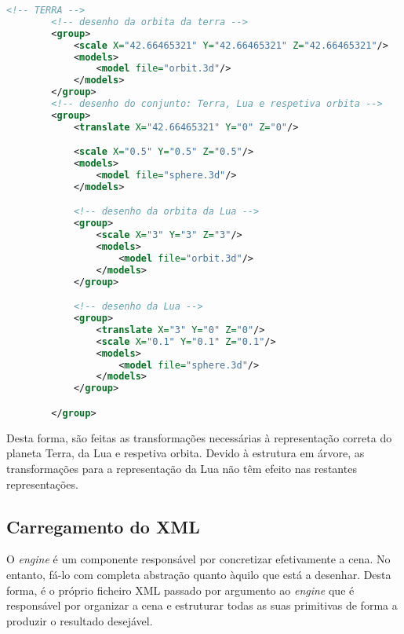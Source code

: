 \documentclass[a4paper]{article}
\begin{document}
\begin{lstlisting}[language=XML, caption=Representação de um exemplo de criação de nodos filhos.]
    <!-- TERRA -->
        <!-- desenho da orbita da terra -->
        <group>
            <scale X="42.66465321" Y="42.66465321" Z="42.66465321"/>
            <models>
                <model file="orbit.3d"/>
            </models>
        </group>
        <!-- desenho do conjunto: Terra, Lua e respetiva orbita -->
        <group>
            <translate X="42.66465321" Y="0" Z="0"/>

            <scale X="0.5" Y="0.5" Z="0.5"/>
            <models>
                <model file="sphere.3d"/>
            </models>

            <!-- desenho da orbita da Lua -->
            <group>
                <scale X="3" Y="3" Z="3"/>
                <models>
                    <model file="orbit.3d"/>
                </models>
            </group>

            <!-- desenho da Lua -->
            <group>
                <translate X="3" Y="0" Z="0"/>
                <scale X="0.1" Y="0.1" Z="0.1"/>
                <models>
                    <model file="sphere.3d"/>
                </models>
            </group>

        </group>
\end{lstlisting}

\par Desta forma, são feitas as transformações necessárias à representação correta do planeta Terra, da Lua e respetiva orbita. Devido à estrutura em árvore, as transformações para a representação da Lua não têm efeito nas restantes representações.




\subsection{Carregamento do XML} %

\hspace{3mm} O \textit{engine} é um componente responsável por concretizar efetivamente a cena. No entanto, fá-lo com completa abstração quanto àquilo que está a desenhar. Desta forma, é o próprio ficheiro XML passado por argumento ao \textit{engine} que é responsável por organizar a cena e estruturar todas as suas primitivas de forma a produzir o resultado desejável.
\end{document}
